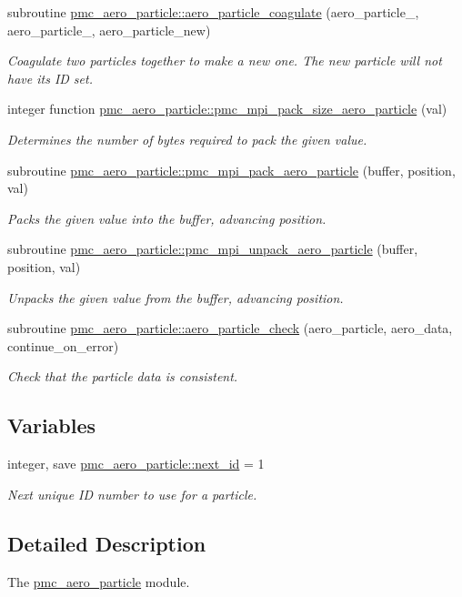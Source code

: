 \begin{DoxyCompactItemize}
subroutine \mbox{\hyperlink{namespacepmc__aero__particle_a16b56468e94b1b0429de015112a4bf6f}{pmc\+\_\+aero\+\_\+particle\+::aero\+\_\+particle\+\_\+coagulate}} (aero\+\_\+particle\+\_, aero\+\_\+particle\+\_, aero\+\_\+particle\+\_\+new)
\begin{DoxyCompactList}\small\item\em Coagulate two particles together to make a new one. The new particle will not have its ID set. \end{DoxyCompactList}\item 
integer function \mbox{\hyperlink{namespacepmc__aero__particle_a1f0365c14bb9b38724842c598cb152ed}{pmc\+\_\+aero\+\_\+particle\+::pmc\+\_\+mpi\+\_\+pack\+\_\+size\+\_\+aero\+\_\+particle}} (val)
\begin{DoxyCompactList}\small\item\em Determines the number of bytes required to pack the given value. \end{DoxyCompactList}\item 
subroutine \mbox{\hyperlink{namespacepmc__aero__particle_acc276aa4c58444d1b3575a80cf758bb4}{pmc\+\_\+aero\+\_\+particle\+::pmc\+\_\+mpi\+\_\+pack\+\_\+aero\+\_\+particle}} (buffer, position, val)
\begin{DoxyCompactList}\small\item\em Packs the given value into the buffer, advancing position. \end{DoxyCompactList}\item 
subroutine \mbox{\hyperlink{namespacepmc__aero__particle_adf382d1563f3e4cece1e8602d809fd71}{pmc\+\_\+aero\+\_\+particle\+::pmc\+\_\+mpi\+\_\+unpack\+\_\+aero\+\_\+particle}} (buffer, position, val)
\begin{DoxyCompactList}\small\item\em Unpacks the given value from the buffer, advancing position. \end{DoxyCompactList}\item 
subroutine \mbox{\hyperlink{namespacepmc__aero__particle_ae78328884d067a525e1e163c549e1fda}{pmc\+\_\+aero\+\_\+particle\+::aero\+\_\+particle\+\_\+check}} (aero\+\_\+particle, aero\+\_\+data, continue\+\_\+on\+\_\+error)
\begin{DoxyCompactList}\small\item\em Check that the particle data is consistent. \end{DoxyCompactList}\end{DoxyCompactItemize}
\subsection*{Variables}
\begin{DoxyCompactItemize}
\item 
integer, save \mbox{\hyperlink{namespacepmc__aero__particle_aff614922ffabac9dab3634049c70a2a8}{pmc\+\_\+aero\+\_\+particle\+::next\+\_\+id}} = 1
\begin{DoxyCompactList}\small\item\em Next unique ID number to use for a particle. \end{DoxyCompactList}\end{DoxyCompactItemize}


\subsection{Detailed Description}
The \mbox{\hyperlink{namespacepmc__aero__particle}{pmc\+\_\+aero\+\_\+particle}} module. 

